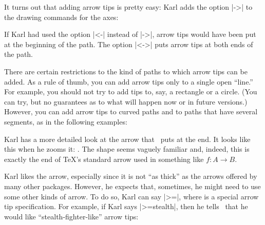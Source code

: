 It turns out that adding arrow tips is pretty easy: Karl adds the option
|->| to the drawing commands for the axes:

\begin{codeexample}[]
\end{codeexample}

If Karl had used the option |<-| instead of |->|, arrow tips would
have been put at the beginning of the path. The option |<->| puts
arrow tips at both ends of the path.

There are certain restrictions to the kind of paths to which arrow tips
can be added. As a rule of thumb, you can add arrow tips only to a
single open ``line.'' For example, you should not try to add tips to,
say, a rectangle or a circle. (You can try, but no guarantees as to what
will happen now or in future versions.) However, you can add arrow
tips to curved paths and to paths that have several segments, as in
the following examples:

\begin{codeexample}[]
\end{codeexample}

Karl has a more detailed look at the arrow that \tikzname\ puts at the
end. It looks like this when he zooms it: . The shape seems vaguely familiar and, indeed, this is
exactly the end of \TeX's standard arrow used in something like
$f\colon A \to B$.


Karl likes the arrow, especially since it is not ``as thick'' as the
arrows offered by many other packages. However, he expects that,
sometimes, he might need to use some other kinds of arrow.
To do so, Karl can say |>=|, where
 is a special arrow tip specification. For
example, if Karl says |>=stealth|, then he tells \tikzname\
that he would like  ``stealth-fighter-like'' arrow tips: 

